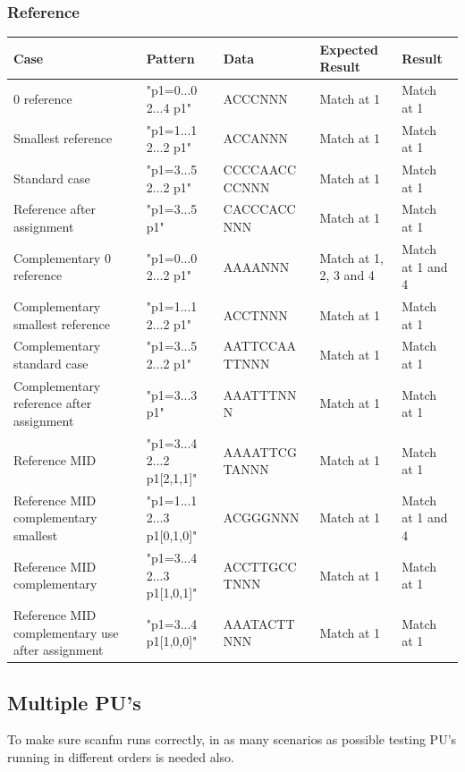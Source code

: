 \documentclass[12pt]{article}
\newcommand{\textapprox}{\raisebox{0.5ex}{\texttildelow}}
\newcommand{\pus}{PU's }
\begin{document}
\subsubsection{Reference}
\begin{table}[h]
\begin{tabular}{p{4cm}|p{3cm}|p{2.5cm}|p{2.5cm}|p{2.5cm}}
Case 			& Pattern & Data & Expected Result & Result \\ \hline
0 reference 	& "p1=0...0 2...4 p1" & ACCCNNN & Match at 1 & Match at 1 \\ \hline
Smallest reference 	& "p1=1...1 2...2 p1" & ACCANNN & Match at 1 & Match at 1 \\ \hline
Standard case	& "p1=3...5 2...2 p1" & CCCCAACC CCNNN & Match at 1 & Match at 1\\ \hline
Reference after assignment & "p1=3...5 p1" & CACCCACC NNN & Match at 1 & Match at 1\\ \hline
Complementary 0 reference & "p1=0...0 2...2 \textapprox p1" & AAAANNN & Match at 1, 2, 3 and 4 & Match at 1 and 4\\ \hline
Complementary smallest reference & "p1=1...1 2...2 \textapprox p1" & ACCTNNN & Match at 1 & Match at 1\\ \hline
Complementary standard case & "p1=3...5 2...2 \textapprox p1" & AATTCCAA TTNNN & Match at 1 & Match at 1\\ \hline
Complementary reference after assignment & "p1=3...3 \textapprox p1" & AAATTTNN N & Match at 1 & Match at 1\\ \hline
Reference MID & "p1=3...4 2...2 p1[2,1,1]" & AAAATTCG TANNN & Match at 1 & Match at 1\\ \hline
Reference MID complementary smallest & "p1=1...1 2...3 \textapprox p1[0,1,0]" & ACGGGNNN & Match at 1 & Match at 1 and 4 \\ \hline
Reference MID complementary & "p1=3...4 2...3 \textapprox p1[1,0,1]" & ACCTTGCC TNNN & Match at 1 & Match at 1 \\ \hline 
Reference MID complementary use after assignment & "p1=3...4 \textapprox p1[1,0,0]" & AAATACTT NNN & Match at 1 & Match at 1
\end{tabular}
\end{table}


\subsection{Multiple \pus}
To make sure scanfm runs correctly, in as many scenarios as possible testing \pus running
in different orders is needed also.
\end{document}
